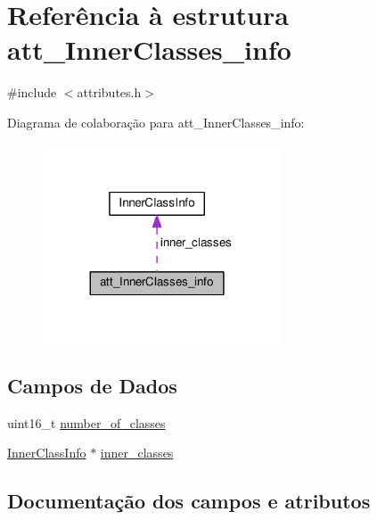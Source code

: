\hypertarget{structatt__InnerClasses__info}{}\section{Referência à estrutura att\+\_\+\+Inner\+Classes\+\_\+info}
\label{structatt__InnerClasses__info}


{\ttfamily \#include $<$attributes.\+h$>$}



Diagrama de colaboração para att\+\_\+\+Inner\+Classes\+\_\+info\+:\nopagebreak
\begin{figure}[H]
\begin{center}
\leavevmode
\includegraphics[width=200pt]{structatt__InnerClasses__info__coll__graph}
\end{center}
\end{figure}
\subsection*{Campos de Dados}
\begin{DoxyCompactItemize}
\item 
uint16\+\_\+t \hyperlink{structatt__InnerClasses__info_a8bb396e50023f850c80a70e0b736cc77}{number\+\_\+of\+\_\+classes}
\item 
\hyperlink{structInnerClassInfo}{Inner\+Class\+Info} $\ast$ \hyperlink{structatt__InnerClasses__info_a68beb2632952ef867172bfcfa327d256}{inner\+\_\+classes}
\end{DoxyCompactItemize}


\subsection{Documentação dos campos e atributos}
